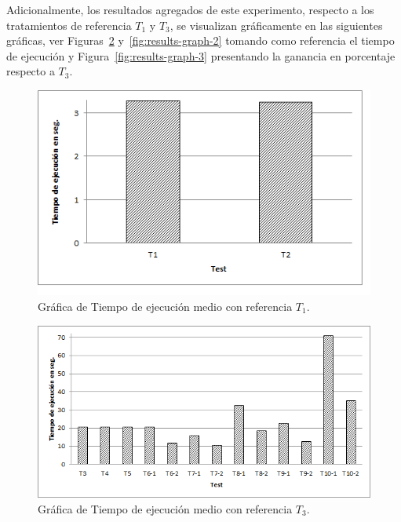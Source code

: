 Adicionalmente, los resultados agregados de este experimento, respecto a los tratamientos de referencia $T_1$ y $T_3$, 
se visualizan gráficamente en las siguientes gráficas, ver Figuras~\ref{fig:results-graph-1} y~\ref{fig:results-graph-2} 
tomando como referencia el tiempo de ejecución y Figura~\ref{fig:results-graph-3} presentando la ganancia en porcentaje respecto a $T_3$.

\begin{figure}[!htb]
\centering
	\includegraphics[width=12cm]{./images/phd/experimentation/t1-t2-tiempo}
\caption{Gráfica de Tiempo de ejecución medio con referencia $T_1$.}
\label{fig:results-graph-1}
\end{figure}

\begin{figure}[!htb]
\centering
	\includegraphics[width=14cm]{./images/phd/experimentation/t3-t10-tiempo}
\caption{Gráfica de Tiempo de ejecución medio con referencia $T_3$.}
\label{fig:results-graph-1}
\end{figure}

